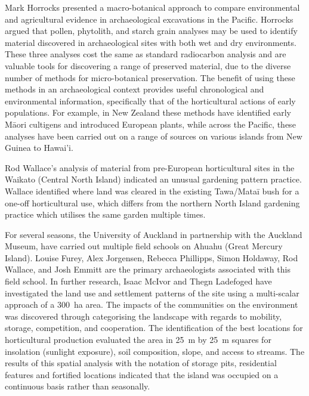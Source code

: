 
Mark
 Horrocks presented a macro-botanical approach to compare environmental and agricultural evidence in archaeological excavations in the Pacific. Horrocks argued that pollen, phytolith, and starch grain analyses may be used to identify material discovered in archaeological sites with both wet and dry environments. These three analyses cost the same as standard radiocarbon analysis and are valuable tools for discovering a range of preserved material, due to the diverse number of methods for micro-botanical preservation. The benefit of using these methods in an archaeological context provides useful chronological and environmental information, specifically that of the horticultural actions of early populations. For example, in New Zealand these methods have identified early Māori cultigens and introduced European plants, while across the Pacific, these analyses have been carried out on a range of sources on various islands from New Guinea to Hawai'i.

Rod Wallace’s analysis of material from pre-European horticultural sites in the Waikato (Central North Island) indicated an unusual gardening pattern practice. Wallace identified where land was cleared in the existing Tawa/Mataī bush for a one-off horticultural use, which differs from the northern North Island gardening practice which utilises the same garden multiple times.

For several seasons, the University of Auckland in partnership with the Auckland Museum, have carried out multiple field schools on Ahuahu (Great Mercury Island). Louise Furey, Alex Jorgensen, Rebecca Phillipps, Simon Holdaway, Rod Wallace, and Josh Emmitt are the primary archaeologists associated with this field school. In further research, Isaac McIvor and Thegn Ladefoged have investigated the land use and settlement patterns of the site using a multi-scalar approach of a \SI{300}{\hectare} area. The impacts of the communities on the environment was discovered through categorising the landscape with regards to mobility, storage, competition, and cooperation. The identification of the best locations for horticultural production evaluated the area in \SI{25}{\metre} by \SI{25}{\metre} squares for insolation (sunlight exposure), soil composition, slope, and access to streams. The results of this spatial analysis with the notation of storage pits, residential features and fortified locations indicated that the island was occupied on a continuous basis rather than seasonally.

